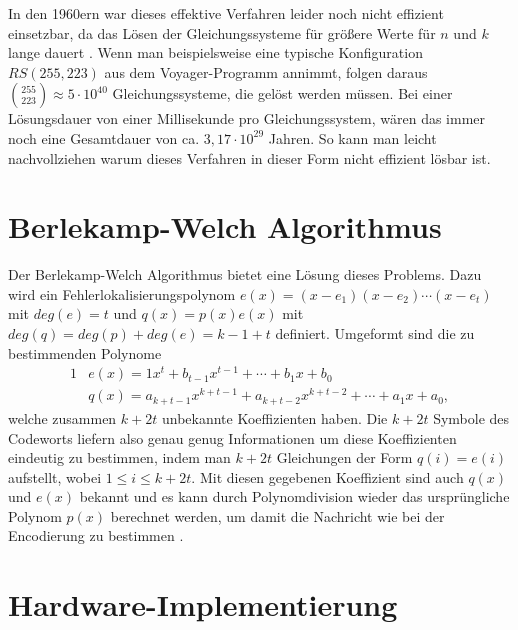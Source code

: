 In den 1960ern war dieses effektive Verfahren leider noch nicht effizient einsetzbar, da das Lösen der Gleichungssysteme für größere Werte für $n$ und $k$ lange dauert \cite{}. 
Wenn man beispielsweise eine typische Konfiguration $RS(255,223)$ aus dem Voyager-Programm annimmt, folgen daraus $\binom{255}{223}\approx5\cdot 10^{40}$ Gleichungssysteme, die gelöst werden müssen.
Bei einer Lösungsdauer von einer Millisekunde pro Gleichungssystem, wären das immer noch eine Gesamtdauer von ca. $3,17\cdot10^{29}$ Jahren. 
So kann man leicht nachvollziehen warum dieses Verfahren in dieser Form nicht effizient lösbar ist.

\section{Berlekamp-Welch Algorithmus}\label{sec:bwAlgo}

Der Berlekamp-Welch Algorithmus bietet eine Lösung dieses Problems. 
Dazu wird ein Fehlerlokalisierungspolynom $e(x)=(x-e_1)(x-e_2)\cdots(x-e_t)$ mit $deg(e)=t$ und $q(x)=p(x)e(x)$ mit $deg(q)=deg(p)+deg(e)=k-1+t$ definiert.
Umgeformt sind die zu bestimmenden Polynome
\begin{alignat}{1}
	&e(x)=1x^t+b_{t-1}x^{t-1}+\cdots+b_1x+b_0\nonumber\\
	&q(x)=a_{k+t-1}x^{k+t-1}+a_{k+t-2}x^{k+t-2}+\cdots+a_1x+a_0,\nonumber
\end{alignat}
welche zusammen $k+2t$ unbekannte Koeffizienten haben.
Die $k+2t$ Symbole des Codeworts liefern also genau genug Informationen um diese Koeffizienten eindeutig zu bestimmen, indem man $k+2t$ Gleichungen der Form $q(i)=e(i)$ aufstellt, wobei $1\leq i\leq k+2t$.
Mit diesen gegebenen Koeffizient sind auch $q(x)$ und $e(x)$ bekannt und es kann durch Polynomdivision wieder das ursprüngliche Polynom $p(x)$ berechnet werden, um damit die Nachricht wie bei der Encodierung zu bestimmen \cite{fengBerlekampWelchAlgorithmGuide}.

\section{Hardware-Implementierung}\label{sec:hardware}

